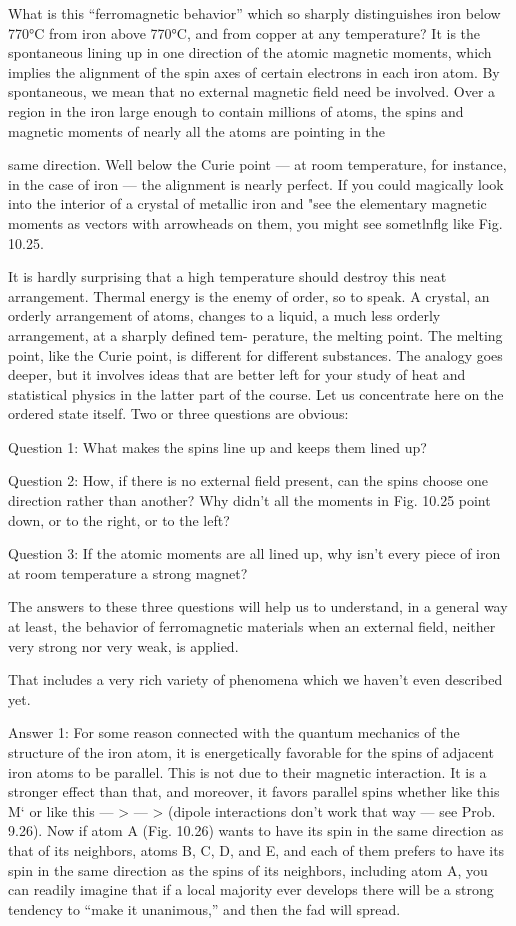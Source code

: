 {{What is this ``ferromagnetic behavior'' which so sharply distinguishes
iron below 770°C from iron above 770°C, and from copper
at any temperature? It is the spontaneous lining up in one direction
of the atomic magnetic moments, which implies the alignment of
the spin axes of certain electrons in each iron atom. By spontaneous,
we mean that no external magnetic field need be involved. Over a
region in the iron large enough to contain millions of atoms, the spins
and magnetic moments of nearly all the atoms are pointing in the

 

same direction. Well below the Curie point --- at room temperature,
for instance, in the case of iron --- the alignment is nearly perfect.
If you could magically look into the interior of a crystal of metallic
iron and "see the elementary magnetic moments as vectors with
arrowheads on them, you might see sometlnflg like Fig. 10.25.

It is hardly surprising that a high temperature should destroy this
neat arrangement. Thermal energy is the enemy of order, so
to speak. A crystal, an orderly arrangement of atoms, changes to a
liquid, a much less orderly arrangement, at a sharply defined tem-
perature, the melting point. The melting point, like the Curie point,
is different for different substances. The analogy goes deeper, but it
involves ideas that are better left for your study of heat and statistical
physics in the latter part of the course. Let us concentrate here on
the ordered state itself. Two or three questions are obvious:

Question 1: What makes the spins line up and keeps them lined
up?

Question 2: How, if there is no external field present, can the
spins choose one direction rather than another? Why didn't all the
moments in Fig. 10.25 point down, or to the right, or to the left?

Question 3: If the atomic moments are all lined up, why isn't every
piece of iron at room temperature a strong magnet?

The answers to these three questions will help us to understand,
in a general way at least, the behavior of ferromagnetic materials
when an external field, neither very strong nor very weak, is applied.

That includes a very rich variety of phenomena which we haven't
even described yet.

Answer 1: For some reason connected with the quantum mechanics
of the structure of the iron atom, it is energetically favorable
for the spins of adjacent iron atoms to be parallel. This is not due
to their magnetic interaction. It is a stronger effect than that, and
moreover, it favors parallel spins whether like this M‘ or like this  --- > --- >
(dipole interactions don't work that way --- see Prob. 9.26). Now if
atom A (Fig. 10.26) wants to have its spin in the same direction as
that of its neighbors, atoms B, C, D, and E, and each of them prefers
to have its spin in the same direction as the spins of its neighbors,
including atom A, you can readily imagine that if a local majority
ever develops there will be a strong tendency to ``make it 
unanimous,'' and then the fad will spread.

}}
